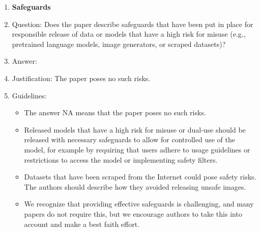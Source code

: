 \documentclass{article}
\begin{document}
\begin{enumerate}
\item {\bf Safeguards}
    \item[] Question: Does the paper describe safeguards that have been put in place for responsible release of data or models that have a high risk for misuse (e.g., pretrained language models, image generators, or scraped datasets)?
    \item[] Answer: \answerNA{} %
    \item[] Justification: The paper poses no such risks.
    \item[] Guidelines:
    \begin{itemize}
        \item The answer NA means that the paper poses no such risks.
        \item Released models that have a high risk for misuse or dual-use should be released with necessary safeguards to allow for controlled use of the model, for example by requiring that users adhere to usage guidelines or restrictions to access the model or implementing safety filters. 
        \item Datasets that have been scraped from the Internet could pose safety risks. The authors should describe how they avoided releasing unsafe images.
        \item We recognize that providing effective safeguards is challenging, and many papers do not require this, but we encourage authors to take this into account and make a best faith effort.
    \end{itemize}


\end{enumerate}
\end{document}
